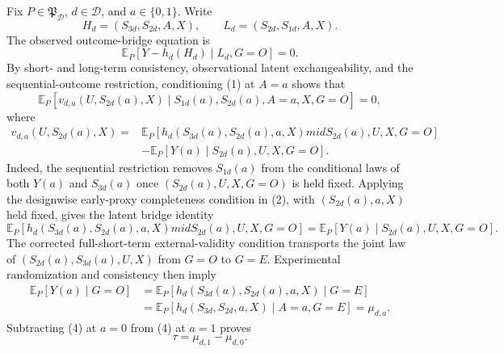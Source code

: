 Fix \(P\in\mathfrak P_{\mathcal D}\), \(d\in\mathcal D\), and \(a\in\{0,1\}\).  Write
\[
 H_d=(S_{3d},S_{2d},A,X),\qquad L_d=(S_{2d},S_{1d},A,X).
\]
The observed outcome-bridge equation is
\[
 \mathbb E_P[Y-h_d(H_d)\mid L_d,G=O]=0. \tag{1}
\]
By short- and long-term consistency, observational latent exchangeability, and the sequential-outcome restriction, conditioning (1) at \(A=a\) shows that
\[
 \mathbb E_P\!\left[v_{d,a}(U,S_{2d}(a),X)\mid
 S_{1d}(a),S_{2d}(a),A=a,X,G=O\right]=0, \tag{2}
\]
where
\[
\begin{aligned}
v_{d,a}(U,S_{2d}(a),X)
={}&\mathbb E_P[h_d(S_{3d}(a),S_{2d}(a),a,X)mid
 S_{2d}(a),U,X,G=O]\\
&-\mathbb E_P[Y(a)\mid S_{2d}(a),U,X,G=O].
\end{aligned}
\]
Indeed, the sequential restriction removes \(S_{1d}(a)\) from the conditional laws of both \(Y(a)\) and \(S_{3d}(a)\) once \((S_{2d}(a),U,X,G=O)\) is held fixed.  Applying the designwise early-proxy completeness condition in (2), with \((S_{2d}(a),a,X)\) held fixed, gives the latent bridge identity
\[
 \mathbb E_P[h_d(S_{3d}(a),S_{2d}(a),a,X)mid S_{2d}(a),U,X,G=O]
 =\mathbb E_P[Y(a)\mid S_{2d}(a),U,X,G=O]. \tag{3}
\]
The corrected full-short-term external-validity condition transports the joint law of \((S_{2d}(a),S_{3d}(a),U,X)\) from \(G=O\) to \(G=E\).  Experimental randomization and consistency then imply
\[
\begin{aligned}
 \mathbb E_P[Y(a)\mid G=O]
 &=\mathbb E_P[h_d(S_{3d}(a),S_{2d}(a),a,X)\mid G=E]\\
 &=\mathbb E_P[h_d(S_{3d},S_{2d},a,X)\mid A=a,G=E]
 =\mu_{d,a}. 
\end{aligned} \tag{4}
\]
Subtracting (4) at \(a=0\) from (4) at \(a=1\) proves
\[
 \tau=\mu_{d,1}-\mu_{d,0}. \tag{5}
\]

